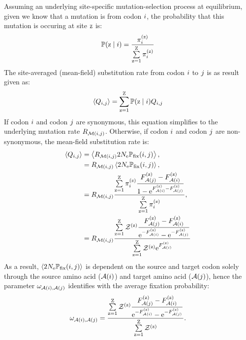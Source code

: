 Assuming an underlying site-specific mutation-selection process at equilibrium, given we know that a mutation is from \gls{codon} ${i}$, the probability that this mutation is occuring at site $\text{z}$ is:
\begin{align}
    \mathbb{P} (\text{z} \mid {i}) = \dfrac{ \pi_{{i}}^{(\text{z})} }{\sum\limits_{\text{z}=1}^{\text{Z}} \pi_{{i}}^{(\text{z})} }
\end{align}
The site-averaged (mean-field) \gls{substitution} rate from \gls{codon} ${i}$ to ${j}$ is as result given as:
\begin{align}
    \left\langle Q_{{i}, {j}} \right\rangle = \sum\limits_{\text{z}=1}^{\text{Z}} \mathbb{P} (\text{z} \mid {i}) Q_{{i}, {j}}
\end{align}
If \gls{codon} ${i}$ and \gls{codon} ${j}$ are \gls{synonymous}, this equation simplifies to the underlying mutation rate $R_{\mathcal{M}({i}, {j})}$.
Otherwise, if \gls{codon} ${i}$ and \gls{codon} ${j}$ are \gls{non-synonymous}, the mean-field \gls{substitution} rate is:
\begin{align}
    \left\langle Q_{{i}, {j}} \right\rangle & = \left\langle R_{\mathcal{M}({i}, {j})} 2 N_{\text{e}} \mathbb{P}_{\text{fix}} ({i}, {j}) \right\rangle, \\
    & = R_{\mathcal{M}({i}, {j})} \left\langle 2 N_{\text{e}} \mathbb{P}_{\text{fix}} ({i}, {j}) \right\rangle, \\
    & = R_{\mathcal{M}({i}, {j})} \dfrac{ \sum\limits_{\text{z}=1}^{\text{Z}} \pi_{{i}}^{(\text{z})} \dfrac{F_{\mathcal{A}({j})}^{(\text{z})} - F_{\mathcal{A}({i})}^{(\text{z})}}{1 - \text{e}^{F_{\mathcal{A}({i})}^{(\text{z})} - F_{\mathcal{A}({j})}^{(\text{z})}}} }{ \sum\limits_{\text{z}=1}^{\text{Z}} \pi_{{i}}^{(\text{z})} }, \\
    & = R_{\mathcal{M}({i}, {j})} \dfrac{ \sum\limits_{\text{z}=1}^{\text{Z}} \mathcal{Z}^{(\text{z})}  \dfrac{F_{\mathcal{A}({j})}^{(\text{z})} - F_{\mathcal{A}({i})}^{(\text{z})}}{ \text{e}^{-F_{\mathcal{A}({i})}^{(\text{z})}} - \text{e}^{ - F_{\mathcal{A}({j})}^{(\text{z})}}} }{  \sum\limits_{\text{z}=1}^{\text{Z}} \mathcal{Z}^{(\text{z})} \text{e}^{F_{\mathcal{A}({i})}^{(\text{z})}} }
\end{align}
As a result, $\left\langle 2 N_{\text{e}} \mathbb{P}_{\text{fix}} ({i}, {j}) \right\rangle$ is dependent on the source and target \gls{codon} solely through the source amino acid ($\mathcal{A}({i})$) and target amino acid ($\mathcal{A}({j})$), hence the parameter $\omega_{\mathcal{A}({i}), \mathcal{A}({j})}$ identifies with the average fixation probability:
\begin{equation}
    \omega_{\mathcal{A}({i}), \mathcal{A}({j})} = \dfrac{ \sum\limits_{\text{z}=1}^{\text{Z}} \mathcal{Z}^{(\text{z})}  \dfrac{F_{\mathcal{A}({j})}^{(\text{z})} - F_{\mathcal{A}({i})}^{(\text{z})}}{ \text{e}^{-F_{\mathcal{A}({i})}^{(\text{z})}} - \text{e}^{ - F_{\mathcal{A}({j})}^{(\text{z})}}} }{  \sum\limits_{\text{z}=1}^{\text{Z}} \mathcal{Z}^{(\text{z})}  }.
\end{equation}

